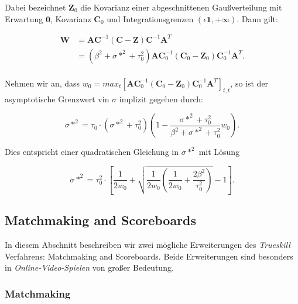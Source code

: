 \documentclass[12pt,a4paper]{scrartcl}
\numberwithin{equation}{section}
\begin{document}
   Dabei bezeichnet $\mathbf{Z}_0$ die Kovarianz einer abgeschnittenen Gaußverteilung mit Erwartung $\mathbf{0}$, Kovarianz $\mathbf{C}_0$ und Integrationsgrenzen
   $(\epsilon \mathbf{1}, + \mathbf{\infty})$. Dann gilt: 
   
   \begin{equation}
    \begin{split}
     \mathbf{W} &= \mathbf{A} \mathbf{C}^{-1} ( \mathbf{C} - \mathbf{Z} ) \mathbf{C}^{-1} \mathbf{A}^T \\
     &= (\beta^2 + \sigma*^2 + \tau_0^2) \mathbf{A} \mathbf{C}_0^{-1} ( \mathbf{C}_0 - \mathbf{Z}_0 ) \mathbf{C}_0^{-1} \mathbf{A}^T. \\
    \end{split}
   \end{equation}
   
   Nehmen wir an, dass $w_0 = max_t[\mathbf{A} \mathbf{C}_0^{-1} ( \mathbf{C}_0 - \mathbf{Z}_0 ) \mathbf{C}_0^{-1} \mathbf{A}^T]_{t,t} $, so
   ist der asymptotische Grenzwert vin $\sigma$ implizit gegeben durch: 
   
   \begin{equation}
    \sigma*^2 = \tau_0 \cdot (\sigma*^2 + \tau_0^2) (1 - \frac{ \sigma*^2 + \tau_0^2 }{ \beta^2 + \sigma*^2 + \tau_0^2 } w_0).
   \end{equation}
   
   Dies entspricht einer quadratischen Gleichung in $\sigma*^2$ mit Lösung 
   
   \begin{equation}
    \sigma*^2 = \tau_0^2 \cdot [\frac{1}{2 w_0} + \sqrt{ \frac{1}{2 w_0} (\frac{1}{2 w_0} + \frac{2 \beta^2}{\tau_0^2}) } -1].
   \end{equation}

  \subsection{Matchmaking and Scoreboards}
  
  In diesem Abschnitt beschreiben wir zwei mögliche Erweiterungen des \textit{Trueskill} Verfahrens: Matchmaking and Scoreboards.
  Beide Erweiterungen sind besonders in \textit{Online-Video-Spielen} von großer Bedeutung. 
  
  \subsubsection{Matchmaking}
  
\end{document}

